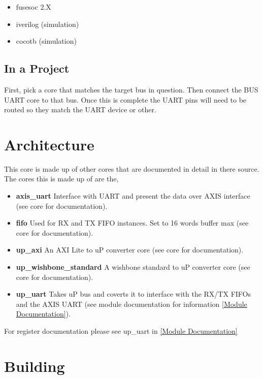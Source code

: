 \begin{itemize}
  \item fusesoc 2.X
  \item iverilog (simulation)
  \item cocotb (simulation)
\end{itemize}







\subsection{In a Project}
\par
First, pick a core that matches the target bus in question. Then connect the BUS UART core to that bus. Once this is complete the UART pins will need
to be routed so they match the UART device or other.

\section{Architecture}
\par
This core is made up of other cores that are documented in detail in there source. The cores this is made up of are the,
\begin{itemize}
  \item \textbf{axis\_uart} Interface with UART and present the data over AXIS interface (see core for documentation).
  \item \textbf{fifo} Used for RX and TX FIFO instances. Set to 16 words buffer max (see core for documentation).
  \item \textbf{up\_axi} An AXI Lite to uP converter core (see core for documentation).
  \item \textbf{up\_wishbone\_standard} A wishbone standard to uP converter core (see core for documentation).
  \item \textbf{up\_uart} Takes uP bus and coverts it to interface with the RX/TX FIFOs and the AXIS UART (see module documentation for information \ref{Module Documentation}).
\end{itemize}

For register documentation please see up\_uart in \ref{Module Documentation}

\section{Building}

